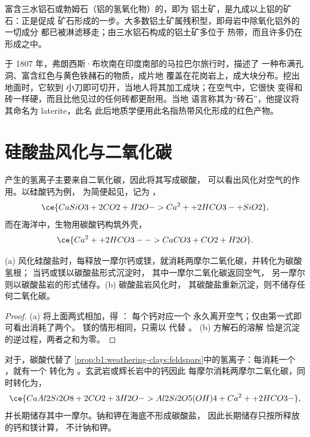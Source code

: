富含三水铝石或勃姆石（铝的氢氧化物）的，即为
铝土矿，是九成以上铝的矿石：正是促成
矿石形成的一步。大多数铝土矿属残积型，即母岩中除氧化铝外的一切成分
都已被淋滤移走；由三水铝石构成的铝土矿多位于
热带，而且许多仍在形成之中。

\begin{history}[来自野外的一词]
于 1807 年，弗朗西斯·布坎南在印度南部的马拉巴尔旅行时，描述了
一种布满孔洞、富含红色与黄色铁赭石的物质，成片地
覆盖在花岗岩上，成大块分布。挖出地面时，它软到
小刀即可切开，当地人将其加工成块；在空气中，它很快
变得和砖一样硬，而且比他见过的任何砖都更耐用。当地
语言称其为“砖石”，他提议将其命名为 laterite，此名
此后地质学便用此名指热带风化形成的红色产物。
\end{history}

\section{硅酸盐风化与二氧化碳}\label{sec:b1:weathering-clays:co2}

产生的氢离子主要来自二氧化碳，因此将其写成碳酸，
可以看出风化对空气的作用。以硅酸钙为例，
为简便起见，记为 ，
\[
  \ce{CaSiO3 + 2 CO2 + H2O -> Ca^2+ + 2 HCO3- + SiO2},
\]
而在海洋中，生物用碳酸钙构筑外壳，
\[
  \ce{Ca^2+ + 2 HCO3- -> CaCO3 + CO2 + H2O}.
\]

\begin{proposition}[风化与二氧化碳]\label{prop:b1:weathering-clays:co2}
(a) 风化硅酸盐时，每释放一摩尔钙或镁，就消耗两摩尔二氧化碳，并转化为碳酸氢根；
当钙或镁以碳酸盐形式沉淀时，
其中一摩尔二氧化碳返回空气，
另一摩尔则以碳酸盐岩的形式储存。(b) 碳酸盐岩风化时，
其碳酸盐重新沉淀，则不储存任何二氧化碳。
\end{proposition}

\begin{proof}
(a) 将上面两式相加，得 ：
每个钙对应一个  永久离开空气；仅由第一式即可看出消耗了两个。
镁的情形相同，只需以  代替 。
(b) 方解石的溶解  恰是沉淀的逆过程，两者之和为零。
\end{proof}

对于，碳酸代替了
\cref{prop:b1:weathering-clays:feldspars}中的氢离子：每消耗一个 ，就有一个 
转化为 。玄武岩或辉长岩中的钙因此
每摩尔消耗两摩尔二氧化碳，同时转化为，
\[
  \ce{CaAl2Si2O8 + 2 CO2 + 3 H2O -> Al2Si2O5(OH)4 + Ca^2+ + 2 HCO3-},
\]
并长期储存其中一摩尔。钠和钾在海底不形成碳酸盐，
因此长期储存只按所释放的钙和镁计算，
不计钠和钾。

